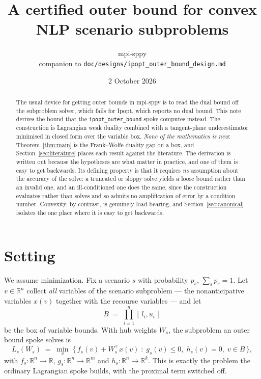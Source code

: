 \documentclass[11pt]{article}
\title{A certified outer bound for convex NLP scenario subproblems}
\author{mpi-sppy \\ \small companion to \texttt{doc/designs/ipopt\_outer\_bound\_design.md}}
\date{2 October 2026}
\theoremstyle{plain}
\theoremstyle{remark}
\newcommand{\R}{\mathbb{R}}
\newcommand{\W}{W}
\begin{document}
\maketitle

\begin{abstract}
The usual device for getting outer bounds in mpi-sppy is to read the dual bound off the subproblem solver, which fails for Ipopt, which reports no dual bound.  This note
derives the bound that the \texttt{ipopt\_outer\_bound} spoke computes instead.
The construction is Lagrangian weak duality combined with a tangent-plane
underestimator minimised in closed form over the variable box.  \emph{None of the
mathematics is new}: Theorem~\ref{thm:main} is the Frank--Wolfe duality gap on a
box, and Section~\ref{sec:literature} places each result against the
literature.  The derivation is written out because the hypotheses are what
matter in practice, and one of them is easy to get backwards.  Its defining
property is that it requires \emph{no} assumption about the accuracy of the
solve: a truncated or sloppy solve yields a loose bound rather than an invalid
one, and an ill-conditioned one does the same, since the construction evaluates
rather than solves and so admits no amplification of error by a condition
number.  Convexity, by contrast, is genuinely load-bearing, and
Section~\ref{sec:canonical} isolates the one place where it is easy to get
backwards.
\end{abstract}

\section{Setting}\label{sec:setting}

We assume minimization. 
Fix a scenario $s$ with probability $p_s$, $\sum_s p_s = 1$.  Let
$v \in \R^{n}$ collect \emph{all} variables of the scenario subproblem --- the
nonanticipative variables $x(v)$ together with the recourse variables --- and let
\[
  B \;=\; \prod_{i=1}^{n} [\,l_i, u_i\,]
\]
be the box of variable bounds.  With hub weights $\W_s$, the subproblem an outer bound
spoke solves is
\begin{equation}\label{eq:sub}
  L_s(\W_s) \;=\; \min_{v} \;\bigl\{\, f_s(v) + \W_s^{\top} x(v)
     \;:\; g_s(v) \le 0,\; h_s(v) = 0,\; v \in B \,\bigr\},
\end{equation}
with $f_s : \R^n \to \R$, $g_s : \R^n \to \R^{m}$ and $h_s : \R^n \to \R^{k}$.
This is exactly the problem the ordinary Lagrangian spoke builds, with the
proximal term switched off.
\end{document}

